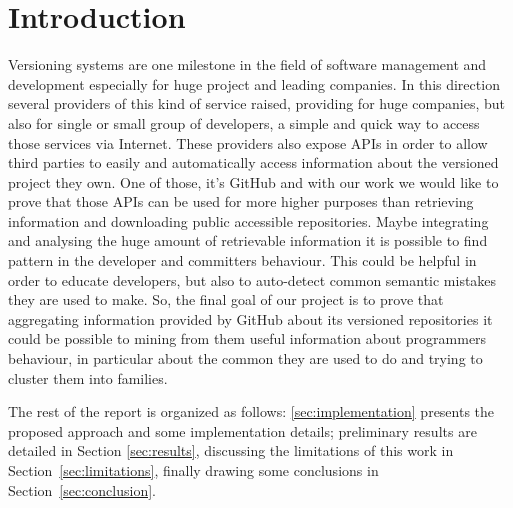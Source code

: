 \section{Introduction}
\label{sec:introduction}
Versioning systems are one milestone in the field of software management and development especially for huge project and leading companies. In this direction several providers of this kind of service raised, providing for huge companies, but also for single or small group of developers, a simple and quick way to access those services via Internet. These providers also expose APIs in order to allow third parties to easily and automatically access information about the versioned project they own.
One of those, it's GitHub and with our work we would like to prove that those APIs can be used for more higher purposes than retrieving information and downloading public accessible repositories. Maybe integrating and analysing the huge amount of retrievable information it is possible to find pattern in the developer and committers behaviour. This could be helpful in order to educate developers, but also to auto-detect common semantic mistakes they are used to make. So, the final goal of our project is to prove that aggregating information provided by GitHub about its versioned repositories it could be possible to mining from them useful information about programmers behaviour, in particular about the common they are used to do and trying to cluster them into families.

The rest of the report is organized as follows: \ref{sec:implementation} presents the proposed approach and some implementation details; preliminary results are detailed in Section \ref{sec:results}, discussing the limitations of this work in Section~\ref{sec:limitations}, finally drawing some conclusions in Section~\ref{sec:conclusion}.